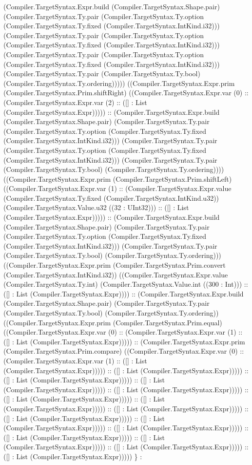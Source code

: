 \documentclass[11pt]{article}
\begin{document}
(Compiler.TargetSyntax.Expr.build (Compiler.TargetSyntax.Shape.pair) (Compiler.TargetSyntax.Ty.pair (Compiler.TargetSyntax.Ty.option (Compiler.TargetSyntax.Ty.fixed (Compiler.TargetSyntax.IntKind.i32))) (Compiler.TargetSyntax.Ty.pair (Compiler.TargetSyntax.Ty.option (Compiler.TargetSyntax.Ty.fixed (Compiler.TargetSyntax.IntKind.i32))) (Compiler.TargetSyntax.Ty.pair (Compiler.TargetSyntax.Ty.option (Compiler.TargetSyntax.Ty.fixed (Compiler.TargetSyntax.IntKind.i32))) (Compiler.TargetSyntax.Ty.pair (Compiler.TargetSyntax.Ty.bool) (Compiler.TargetSyntax.Ty.ordering))))) ((Compiler.TargetSyntax.Expr.prim (Compiler.TargetSyntax.Prim.shiftRight) ((Compiler.TargetSyntax.Expr.var (0) :: (Compiler.TargetSyntax.Expr.var (2) :: ([] : List (Compiler.TargetSyntax.Expr))))) :: (Compiler.TargetSyntax.Expr.build (Compiler.TargetSyntax.Shape.pair) (Compiler.TargetSyntax.Ty.pair (Compiler.TargetSyntax.Ty.option (Compiler.TargetSyntax.Ty.fixed (Compiler.TargetSyntax.IntKind.i32))) (Compiler.TargetSyntax.Ty.pair (Compiler.TargetSyntax.Ty.option (Compiler.TargetSyntax.Ty.fixed (Compiler.TargetSyntax.IntKind.i32))) (Compiler.TargetSyntax.Ty.pair (Compiler.TargetSyntax.Ty.bool) (Compiler.TargetSyntax.Ty.ordering)))) ((Compiler.TargetSyntax.Expr.prim (Compiler.TargetSyntax.Prim.shiftLeft) ((Compiler.TargetSyntax.Expr.var (1) :: (Compiler.TargetSyntax.Expr.value (Compiler.TargetSyntax.Ty.fixed (Compiler.TargetSyntax.IntKind.u32)) (Compiler.TargetSyntax.Value.u32 ((32 : UInt32))) :: ([] : List (Compiler.TargetSyntax.Expr))))) :: (Compiler.TargetSyntax.Expr.build (Compiler.TargetSyntax.Shape.pair) (Compiler.TargetSyntax.Ty.pair (Compiler.TargetSyntax.Ty.option (Compiler.TargetSyntax.Ty.fixed (Compiler.TargetSyntax.IntKind.i32))) (Compiler.TargetSyntax.Ty.pair (Compiler.TargetSyntax.Ty.bool) (Compiler.TargetSyntax.Ty.ordering))) ((Compiler.TargetSyntax.Expr.prim (Compiler.TargetSyntax.Prim.convert (Compiler.TargetSyntax.IntKind.i32)) ((Compiler.TargetSyntax.Expr.value (Compiler.TargetSyntax.Ty.int) (Compiler.TargetSyntax.Value.int ((300 : Int))) :: ([] : List (Compiler.TargetSyntax.Expr)))) :: (Compiler.TargetSyntax.Expr.build (Compiler.TargetSyntax.Shape.pair) (Compiler.TargetSyntax.Ty.pair (Compiler.TargetSyntax.Ty.bool) (Compiler.TargetSyntax.Ty.ordering)) ((Compiler.TargetSyntax.Expr.prim (Compiler.TargetSyntax.Prim.equal) ((Compiler.TargetSyntax.Expr.var (0) :: (Compiler.TargetSyntax.Expr.var (1) :: ([] : List (Compiler.TargetSyntax.Expr))))) :: (Compiler.TargetSyntax.Expr.prim (Compiler.TargetSyntax.Prim.compare) ((Compiler.TargetSyntax.Expr.var (0) :: (Compiler.TargetSyntax.Expr.var (1) :: ([] : List (Compiler.TargetSyntax.Expr))))) :: ([] : List (Compiler.TargetSyntax.Expr))))) :: ([] : List (Compiler.TargetSyntax.Expr))))) :: ([] : List (Compiler.TargetSyntax.Expr))))) :: ([] : List (Compiler.TargetSyntax.Expr))))) :: ([] : List (Compiler.TargetSyntax.Expr))))) :: ([] : List (Compiler.TargetSyntax.Expr))))) :: ([] : List (Compiler.TargetSyntax.Expr))))) :: ([] : List (Compiler.TargetSyntax.Expr))))) :: ([] : List (Compiler.TargetSyntax.Expr))))) :: ([] : List (Compiler.TargetSyntax.Expr))))) :: ([] : List (Compiler.TargetSyntax.Expr))))) :: ([] : List (Compiler.TargetSyntax.Expr))))) :: ([] : List (Compiler.TargetSyntax.Expr))))) :: ([] : List (Compiler.TargetSyntax.Expr))))) \} : 
\end{document}
